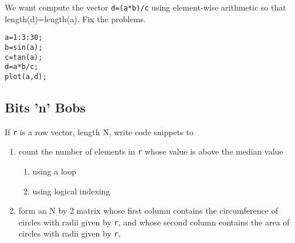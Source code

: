 \documentclass[letterpaper]{article}
\begin{document}
\vspace{2in}

We want compute the vector \verb+d=(a*b)/c+ using element-wise arithmetic so that length(d)=length(a).  Fix the problems.

\begin{verbatim}
a=1:3:30;
b=sin(a);
c=tan(a);
d=a*b/c;
plot(a,d);
\end{verbatim}

\newpage
\subsection {Bits 'n' Bobs}

If \verb+r+ is a row vector, length N, write code snippets to
\begin{enumerate}
\item count the number of elements in \verb+r+ whose value is above the median value
\begin{enumerate}
\item using a loop
\item using logical indexing
\end{enumerate}
\vspace {3.5in}
\item form an N by 2 matrix whose first column contains the circumference of circles with radii given by \verb+r+, and whose second column  contains the area of circles with radii given by \verb+r+,
\vspace{1.5in}
\end{enumerate}
\end{document}
